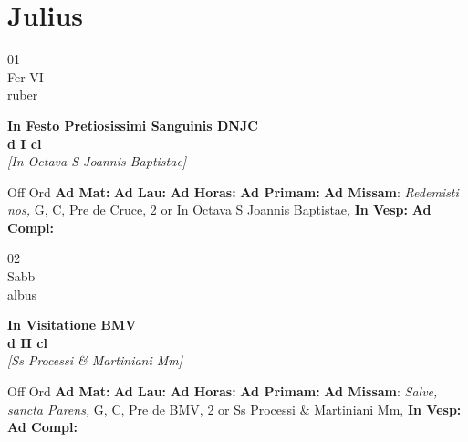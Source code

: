 \documentclass[10pt, openany]{book}
\begin{document}
    \chapter{Julius}
                    
    \begin{center}
        \begin{minipage}{3.5in}
            \vspace{2em}
            \begin{minipage}{0.5in}
                {\Huge 01} \\
                {\normalsize Fer VI} \\
                {\normalsize ruber}
            \end{minipage}
            \begin{minipage}{3.0in}
                \textbf{ \large In Festo Pretiosissimi Sanguinis DNJC \\
                \textnormal{\normalsize d I cl}} \\ \textit{[In Octava S Joannis Baptistae]} \\ 
            \end{minipage}
            \begin{justify}Off Ord
                \textbf{Ad Mat: }
                \textbf{Ad Lau: }
                \textbf{Ad Horas: }
                \textbf{Ad Primam: }\textbf{Ad Missam}: \textit{Redemisti nos,} G, C, Pre de Cruce, 2 or In Octava S Joannis Baptistae,  
                \textbf{In Vesp: }
                \textbf{Ad Compl: }
            \end{justify}
        \end{minipage}
    \end{center}

    \begin{center}
        \begin{minipage}{3.5in}
            \vspace{2em}
            \begin{minipage}{0.5in}
                {\Huge 02} \\
                {\normalsize Sabb} \\
                {\normalsize albus}
            \end{minipage}
            \begin{minipage}{3.0in}
                \textbf{ \large In Visitatione BMV \\
                \textnormal{\normalsize d II cl}} \\ \textit{[Ss Processi \& Martiniani Mm]} \\ 
            \end{minipage}
            \begin{justify}Off Ord
                \textbf{Ad Mat: }
                \textbf{Ad Lau: }
                \textbf{Ad Horas: }
                \textbf{Ad Primam: }\textbf{Ad Missam}: \textit{Salve, sancta Parens,} G, C, Pre de BMV, 2 or Ss Processi \& Martiniani Mm,  
                \textbf{In Vesp: }
                \textbf{Ad Compl: }
            \end{justify}
        \end{minipage}
    \end{center}
\end{document}
